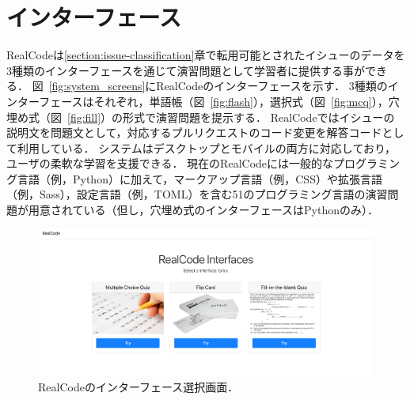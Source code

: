 \def\vector#1{\mbox{\boldmath $#1$}}

\chapter[インターフェース]{インターフェース}
\graphicspath{{Chapters_implementation/Figs/}}



RealCodeは\ref{section:issue-classification}章で転用可能とされたイシューのデータを3種類のインターフェースを通じて演習問題として学習者に提供する事ができる．
図~\ref{fig:system_screens}にRealCodeのインターフェースを示す．
3種類のインターフェースはそれぞれ，単語帳（図~\ref{fig:flash}），選択式（図~\ref{fig:mcq}），穴埋め式（図~\ref{fig:fill}）の形式で演習問題を提示する．
RealCodeではイシューの説明文を問題文として，対応するプルリクエストのコード変更を解答コードとして利用している．
システムはデスクトップとモバイルの両方に対応しており，ユーザの柔軟な学習を支援できる\cite{gassler2004integrated}．
現在のRealCodeには一般的なプログラミング言語（例，Python）に加えて，マークアップ言語（例，CSS）や拡張言語（例，Sass），設定言語（例，TOML）を含む51のプログラミング言語の演習問題が用意されている（但し，穴埋め式のインターフェースはPythonのみ）．

\begin{figure}[H]
	\centering
  \includegraphics[width=1.0\columnwidth]{20181228-realcode-interfaces-select.png}
  \caption{RealCodeのインターフェース選択画面．}
  \label{fig:interface-selector}
\end{figure}

